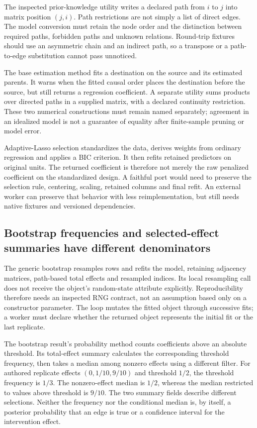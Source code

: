 The inspected prior-knowledge utility writes a declared path from $i$ to
$j$ into matrix position $(j,i)$. Path restrictions are not simply a list
of direct edges. The model conversion must retain the node order and the
distinction between required paths, forbidden paths and unknown relations.
Round-trip fixtures should use an asymmetric chain and an indirect path,
so a transpose or a path-to-edge substitution cannot pass unnoticed.
\citep{exec24_lingam_source,exec24_lingam_choice}

The base estimation method fits a destination on the source and its
estimated parents. It warns when the fitted causal order places the
destination before the source, but still returns a regression coefficient.
A separate utility sums products over directed paths in a supplied matrix,
with a declared continuity restriction. These two numerical constructions
must remain named separately; agreement in an idealized model is not a
guarantee of equality after finite-sample pruning or model error.
\citep{exec24_lingam_source}

Adaptive-Lasso selection standardizes the data, derives weights from
ordinary regression and applies a BIC criterion. It then refits retained
predictors on original units. The returned coefficient is therefore not
merely the raw penalized coefficient on the standardized design. A faithful
port would need to preserve the selection rule, centering, scaling,
retained columns and final refit. An external worker can preserve that
behavior with less reimplementation, but still needs native fixtures and
versioned dependencies.~\citep{exec24_lingam_source,exec24_lingam_choice}

\subsection{Bootstrap frequencies and selected-effect summaries have different denominators}
The generic bootstrap resamples rows and refits the model, retaining
adjacency matrices, path-based total effects and resampled indices.
Its local resampling call does not receive the object's random-state
attribute explicitly. Reproducibility therefore needs an inspected RNG
contract, not an assumption based only on a constructor parameter.
The loop mutates the fitted object through successive fits; a worker must
declare whether the returned object represents the initial fit or the
last replicate.~\citep{exec24_lingam_source}

The bootstrap result's probability method counts coefficients above an
absolute threshold. Its total-effect summary calculates the corresponding
threshold frequency, then takes a median among nonzero effects using a
different filter. For authored replicate effects $(0,1/10,9/10)$ and
threshold $1/2$, the threshold frequency is $1/3$. The nonzero-effect
median is $1/2$, whereas the median restricted to values above threshold
is $9/10$. The two summary fields describe different selections.
Neither the frequency nor the conditional median is, by itself, a
posterior probability that an edge is true or a confidence interval for
the intervention effect.~\citep{exec24_lingam_source,exec24_lingam_choice}

